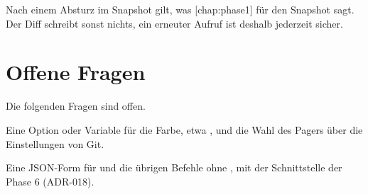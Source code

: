 Nach einem Absturz im Snapshot gilt, was [chap:phase1] für den Snapshot sagt.
Der Diff schreibt sonst nichts, ein erneuter Aufruf ist deshalb jederzeit sicher.

\section{Offene Fragen}

Die folgenden Fragen sind offen.

\startitemize
\item Eine Option oder Variable für die Farbe, etwa , und die Wahl des Pagers
über die Einstellungen von Git.
\item Eine JSON-Form für  und die übrigen Befehle ohne ,
mit der Schnittstelle der Phase 6 (ADR-018).
\stopitemize
